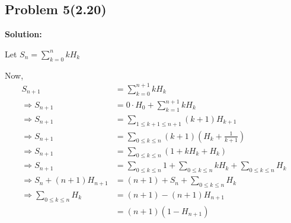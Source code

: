 \subsection{Problem 5(2.20)}
\textbf{}
\par

\begin{flushleft}
\textbf{Solution: }
\par
Let $ S_n = \sum_{k=0}^{n} kH_k $
\par
Now,
$$
\begin{aligned}
    S_{n+1} &= \sum_{k=0}^{n+1} kH_k \\
    \Rightarrow S_{n+1} &= 0 \cdot H_0 + \sum_{k=1}^{n+1} kH_k \\
    \Rightarrow S_{n+1} &= \sum_{1 \leq k+1 \leq n+1}^{} (k+1)H_{k+1} \\
    \Rightarrow S_{n+1} &= \sum_{0 \leq k \leq n} (k+1)(H_k + \frac{1}{k+1}) \\
    \Rightarrow S_{n+1} &= \sum_{0 \leq k \leq n} (1 + kH_k + H_k) \\
    \Rightarrow S_{n+1} &= \sum_{0 \leq k \leq n} 1 + \sum_{0 \leq k \leq n} kH_k + \sum_{0 \leq k \leq n} H_k \\
    \Rightarrow S_n + (n+1)H_{n+1} &= (n+1) + S_n + \sum_{0 \leq k \leq n} H_k \\
    \Rightarrow \sum_{0 \leq k \leq n} H_k &= (n+1) - (n+1)H_{n+1} \\
    & = (n+1)(1-H_{n+1})  
\end{aligned}
$$
\end{flushleft}